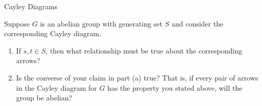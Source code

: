 \begin{section}{Cayley Diagrams}
\begin{problem}
Suppose $G$ is an abelian group with generating set $S$ and consider the corresponding Cayley diagram.
\begin{enumerate}[label=\rm{(\alph*)}]
\item If $s,t\in S$, then what relationship must be true about the corresponding arrows?
\item Is the converse of your claim in part (a) true?  That is, if every pair of arrows in the Cayley diagram for $G$ has the property you stated above, will the group be abelian?
\end{enumerate}
\end{problem}

\end{section}